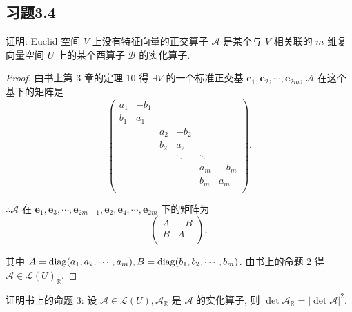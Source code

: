 \documentclass[color=black,device=normal,lang=cn,mode=geye]{elegantnote}
\begin{document}
\subsection{习题3.4}
\begin{exercise}%
    证明: Euclid 空间 $V$ 上没有特征向量的正交算子 $\mathcal{A}$ 是某个与 $V$ 相关联的 $m$ 维复向量空间 $U$ 上的某个酉算子 $\mathcal{B}$ 的实化算子.
\end{exercise}
\begin{proof}
    由书上第 3 章的定理 10 得 $\exists V$ 的一个标准正交基 $\boldsymbol{e}_1,\boldsymbol{e}_2,\cdots,\boldsymbol{e}_{2m}$, $\mathcal{A}$ 在这个基下的矩阵是
    \[\begin{pmatrix}
        a_1 & -b_1 \\
        b_1 & a_1 \\
        && a_2 & -b_2 \\
        && b_2 & a_2 \\
        &&& \ddots & \ddots \\
        &&&& a_m & -b_m \\
        &&&& b_m & a_m \\
    \end{pmatrix}.\]

    $\therefore\mathcal{A}$ 在 $\boldsymbol{e}_1,\boldsymbol{e}_3,\cdots,\boldsymbol{e}_{2m-1},\boldsymbol{e}_2,\boldsymbol{e}_4,\cdots,\boldsymbol{e}_{2m}$ 下的矩阵为
    \[\begin{pmatrix}
        A & -B \\
        B & A \\
    \end{pmatrix},\]

    其中 $A=\operatorname{diag} (a_1,a_2,\cdots,a_m),B=\operatorname{diag} (b_1,b_2,\cdots,b_m)$. 由书上的命题 2 得 $\mathcal{A}\in\mathcal{L}(U)_\mathbb{R}$.
\end{proof}
\begin{exercise}%
    证明书上的命题 3: 设 $\mathcal{A}\in\mathcal{L}(U),\mathcal{A}_\mathbb{R}$ 是 $\mathcal{A}$ 的实化算子, 则 $\det\mathcal{A}_\mathbb{R}=|\det\mathcal{A}|^2$.
\end{exercise}
\end{document}
